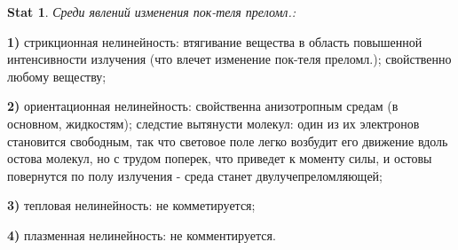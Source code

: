 \documentclass[a4paper,12pt]{article}
\theoremstyle{definition} %
\newtheorem{Stat}{Stat}[section]
\theoremstyle{definition} %
\theoremstyle{remark} %
\begin{document}
\begin{Stat}\label{stat \theStat}
	\textit{Среди явлений изменения пок-теля преломл.:} \\
	\par \textbf{1)} стрикционная нелинейность: втягивание вещества в область повышенной интенсивности излучения (что влечет изменение пок-теля преломл.); свойственно любому веществу; \\
	\par \textbf{2)} ориентационная нелинейность: свойственна анизотропным средам (в основном, жидкостям); следстие вытянусти молекул: один из их электронов становится свободным, так что световое поле легко возбудит его движение вдоль остова молекул, но с трудом поперек, что приведет к моменту силы, и остовы повернутся по полу излучения - среда станет двулучепреломляющей; \\
	\par \textbf{3)} тепловая нелинейность: не комметируется; \\
	\par \textbf{4)} плазменная нелинейность: не комментируется.
\end{Stat}




















	
	
	
\end{document}
